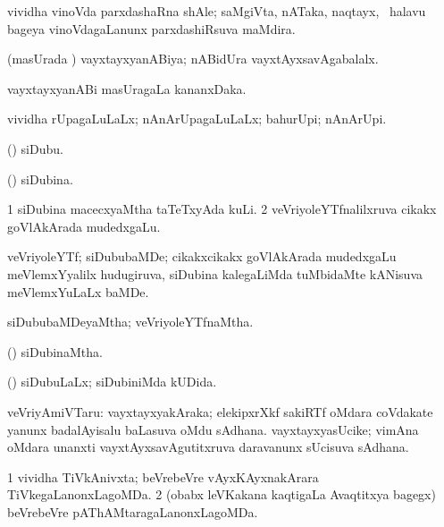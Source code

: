 \bentry
{}
\gl{\nA}
\expl{}
\bmng
 vividha vinoVda parxdashaRna shAle; saMgiVta, nATaka, naqtayx, \mo\ halavu bageya vinoVdagaLanunx parxdashiRsuva maMdira. 
\emng
\eentry

\bentry
{} 
\gl{\gu}
\expl{}
\bmng
 (masUrada \vi) vayxtayxyanABiya; nABidUra vayxtAyxsavAgabalalx. 
\emng
\eentry

\bentry
{} 
\gl{\nA}
\expl{(\bava)}
\bmng
 vayxtayxyanABi masUragaLa kananxDaka. 
\emng
\eentry

\bentry
{} 
\gl{\gu}
\expl{}
\bmng
 vividha rUpagaLuLaLx; nAnArUpagaLuLaLx; bahurUpi; nAnArUpi. 
\emng
\eentry

\bentry
{} 
\gl{\nA}
\expl{}
\bmng
 (\veYshA) siDubu. 
\emng
\eentry

\bentry
{} 
\gl{\gu}
\expl{}
\bmng
 (\veYshA) siDubina. 
\emng
\eentry

\bentry
{} 
\gl{\nA}
\expl{}
\bmng
\bnum
\num{1} siDubina macecxyaMtha taTeTxyAda kuLi. 
\num{2} veVriyoleYTfnalilxruva cikakx goVlAkArada mudedxgaLu. 
\enum
\emng
\eentry

\bentry
{} 
\gl{\nA}
\expl{}
\bmng
 veVriyoleYTf; siDububaMDe; cikakxcikakx goVlAkArada mudedxgaLu meVlemxYyalilx hudugiruva, siDubina kalegaLiMda tuMbidaMte kANisuva meVlemxYuLaLx baMDe. 
\emng
\eentry

\bentry
{} 
\gl{\gu}
\expl{}
\bmng
 siDububaMDeyaMtha; veVriyoleYTfnaMtha. 
\emng
\eentry

\bentry
{} 
\gl{\gu}
\expl{}
\bmng
 (\veYshA) siDubinaMtha. 
\emng
\eentry

\bentry
{} 
\gl{\gu}
\expl{}
\bmng
 (\veYshA) siDubuLaLx; siDubiniMda kUDida. 
\emng
\eentry

\bentry
{} 
\gl{\nA}
\expl{}
\bmng
 veVriyAmiVTaru: 
\banum
{} vayxtayxyakAraka; elekipxrXkf sakiRTf oMdara coVdakate yanunx badalAyisalu baLasuva oMdu sAdhana. 
 vayxtayxyasUcike; vimAna oMdara unanxti vayxtAyxsavAgutitxruva daravanunx sUcisuva sAdhana. 
\eanum
\emng
\eentry

\bentry
{} 
\gl{\gu}
\expl{}
\bmng
\bnum
\num{1} vividha TiVkAnivxta; beVrebeVre vAyxKAyxnakArara TiVkegaLanonxLagoMDa. 
\num{2} (obabx leVKakana kaqtigaLa Avaqtitxya bagegx) beVrebeVre pAThAMtaragaLanonxLagoMDa. 
\enum
\emng
\eentry

